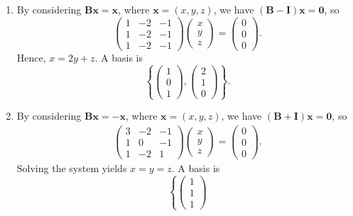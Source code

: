 \documentclass[12pt]{article}
\begin{document}
\begin{enumerate}[label=\textbf{(\alph*)}]
    \itemsep 0em
    \item By considering $\mathbf{Bx}=\mathbf{x}$, where $\mathbf{x}=\left(x,y,z\right)$, we have $\left(\mathbf{B}-\mathbf{I}\right)\mathbf{x}=\mathbf{0}$, so \[\begin{pmatrix}
        1&-2&-1\\1&-2&-1\\1&-2&-1
    \end{pmatrix}\begin{pmatrix}
        x\\y\\z
    \end{pmatrix}=\begin{pmatrix}
        0\\0\\0
    \end{pmatrix}.\]
    Hence, $x=2y+z$. A basis is \[\left\{\begin{pmatrix}
        1\\0\\1
    \end{pmatrix},\begin{pmatrix}
        2\\1\\0
    \end{pmatrix}\right\}.\]
    \item By considering $\mathbf{Bx}=-\mathbf{x}$, where $\mathbf{x}=\left(x,y,z\right)$, we have $\left(\mathbf{B}+\mathbf{I}\right)\mathbf{x}=\mathbf{0}$, so \begin{align*}
        \begin{pmatrix}
            3&-2&-1\\1&0&-1\\1&-2&1
        \end{pmatrix}\begin{pmatrix}
            x\\y\\z
        \end{pmatrix}=\begin{pmatrix}
            0\\0\\0
        \end{pmatrix}.
    \end{align*}
    Solving the system yields $x=y=z$. A basis is \[\left\{\begin{pmatrix}
        1\\1\\1

\end{pmatrix}\]
\end{enumerate}
\end{document}
